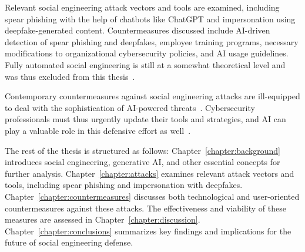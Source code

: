 %
%
Relevant social engineering attack vectors and tools are examined, including spear phishing with the help of chatbots like ChatGPT and impersonation using deepfake-generated content. Countermeasures discussed include AI-driven detection of spear phishing and deepfakes, employee training programs, necessary modifications to organizational cybersecurity policies, and AI usage guidelines. Fully automated social engineering is still at a somewhat theoretical level and was thus excluded from this thesis~\citep{hatfield_SE_Evolution_Concept_2018}.

\newpage

%
%
Contemporary countermeasures against social engineering attacks are ill-equipped to deal with the sophistication of AI-powered threats~\citep{blauth_AI_Crime_Overview_Malicious_Use_Abuse_2022, king_AI_Crime_Interdisciplinary_Analysis_2019}. Cybersecurity professionals must thus urgently update their tools and strategies, and AI can play a valuable role in this defensive effort as well~\citep{fakhouri_AI_Driven_Solutions_SE_Attacks_2024, tsinganos_Towards_Automated_Recognition_Chat_SE_Enterprise_2018}.





%
%
The rest of the thesis is structured as follows: Chapter~\ref{chapter:background} introduces social engineering, generative AI, and other essential concepts for further analysis. Chapter~\ref{chapter:attacks} examines relevant attack vectors and tools, including spear phishing and impersonation with deepfakes. Chapter~\ref{chapter:countermeasures} discusses both technological and user-oriented countermeasures against these attacks. The effectiveness and viability of these measures are assessed in Chapter~\ref{chapter:discussion}. Chapter~\ref{chapter:conclusions} summarizes key findings and implications for the future of social engineering defense.
